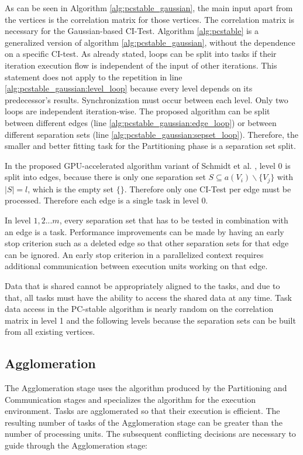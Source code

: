 As can be seen in Algorithm \ref{alg:pcstable_gaussian}, the main input apart from the vertices is the correlation matrix for those vertices. The correlation matrix is necessary for the Gaussian-based CI-Test. Algorithm \ref{alg:pcstable} is a generalized version of algorithm \ref{alg:pcstable_gaussian}, without the dependence on a specific CI-test.
As already stated, loops can be split into tasks if their iteration execution flow is independent of the input of other iterations. This statement does not apply to the repetition in line \ref{alg:pcstable_gaussian:level_loop} because every level depends on its predecessor's results. Synchronization must occur between each level.
Only two loops are independent iteration-wise. The proposed algorithm can be split between different edges (line \ref{alg:pcstable_gaussian:edge_loop}) or between different separation sets (line \ref{alg:pcstable_gaussian:sepset_loop}). Therefore, the smaller and better fitting task for the Partitioning phase is a separation set split.

In the proposed GPU-accelerated algorithm variant of Schmidt et al. \cite{schmidtOrderIndependentConstraintBasedCausal2018}, level 0 is split into edges, because there is only one separation set $S \subseteq a(V_i ) \backslash \{V_j\}$ with $| S | = l$, which is the empty set $\{\}$. Therefore only one CI-Test per edge must be processed. Therefore each edge is a single task in level 0.

In level $1,2 ... m$, every separation set that has to be tested in combination with an edge is a task. Performance improvements can be made by having an early stop criterion such as a deleted edge so that other separation sets for that edge can be ignored. An early stop criterion in a parallelized context requires additional communication between execution units working on that edge.

Data that is shared cannot be appropriately aligned to the tasks, and due to that, all tasks must have the ability to access the shared data at any time. Task data access in the PC-stable algorithm is nearly random on the correlation matrix in level 1 and the following levels because the separation sets can be built from all existing vertices. 

    
\subsection{Agglomeration}
\label{chap:agglo}
The Agglomeration stage uses the algorithm produced by the Partitioning and Communication stages and specializes the algorithm for the execution environment. Tasks are agglomerated so that their execution is efficient. The resulting number of tasks of the Agglomeration stage can be greater than the number of processing units. The subsequent conflicting decisions are necessary to guide through the Agglomeration stage:

